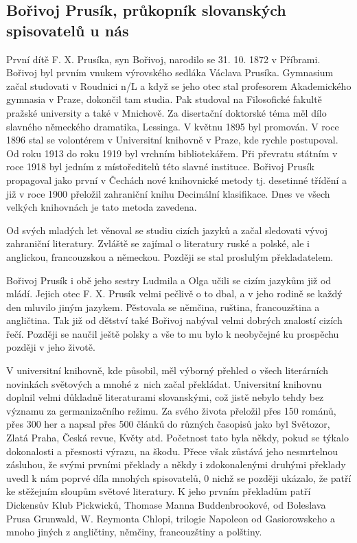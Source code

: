 \documentclass[../dejiny-rodu-prusiku.tex]{subfiles}
\begin{document}
\subsection{Bořivoj Prusík, průkopník slovanských spisovatelů u nás}

První dítě F. X. Prusíka, syn Bořivoj, narodilo se 31. 10. 1872 v Příbrami. Bořivoj byl prvním vnukem výrovského sedláka Václava Prusíka. Gymnasium začal studovati v Roudnici n/L  a když se jeho otec stal profesorem Akademického gymnasia v Praze, dokončil tam studia. Pak studoval na Filosofické fakultě pražské university a také v Mnichově. Za disertační doktorské téma měl dílo slavného německého dramatika, Lessinga. V květnu 1895 byl promován. V roce 1896 stal se volontérem v Universitní knihovně v Praze, kde rychle postupoval. Od roku 1913 do roku 1919 byl vrchním bibliotekářem. Při převratu státním v roce 1918 byl jedním z místoředitelů této slavné instituce. Bořivoj Prusík propagoval jako první v Čechách nové knihovnické metody tj. desetinné třídění a již v roce 1900 pře­ložil zahraniční knihu Decimální klasifikace. Dnes ve všech velkých knihovnách je tato metoda zavedena.

Od svých mladých let věnoval se studiu cizích jazyků a za­čal sledovati vývoj zahraniční literatury. Zvláště se zajímal o literatury ruské a polské, ale i anglickou, francouzskou a německou. Později se stal proslulým překladatelem.

Bořivoj Prusík i obě jeho sestry Ludmila a Olga učili se cizím jazykům již od mládí. Jejich otec F. X. Prusík velmi pečlivě o to dbal, a v jeho rodině se každý den mluvilo jiným jazykem. Pěstovala se němčina, ruština, francouzština a angličtina. Tak již od dětství také Bořivoj nabýval velmi dobrých znalostí cizích řečí. Pozdě­ji se naučil ještě polsky a vše to mu bylo k neobyčejné­ ku prospěchu později v jeho životě.

V universitní knihovně, kde působil, měl výborný přehled o všech literárních novinkách světových a mnohé z nich začal překládat. Universitní knihovnu doplnil velmi důkladně literaturami slovanskými, což jistě nebylo tehdy bez významu za germanizačního režimu. Za svého života přeložil přes 150 románů, přes 300 her a napsal přes 500 článků do různých časopisů jako byl Světozor, Zlatá Praha, Česká revue, Květy atd. Početnost tato byla někdy, pokud se týkalo dokonalosti a přesnosti výrazu, na škodu. Přece však zůstává jeho nesmrtelnou zásluhou, že svý­mi prvními překlady a někdy i zdokonalenými druhými překlady uvedl k nám poprvé díla mnohých spisovatelů, 0 nichž se později ukázalo, že patří ke stěžejním sloupům světové literatury. K jeho prvním překladům patří Dickensův Klub Pickwicků, Thomase Manna Buddenbrookové, od Boleslava Prusa Grunwald, W. Reymonta  Chlopi, trilogie Napoleon od Gasiorowskeho a mnoho jiných z angličtiny, němčiny, francouzštiny a polštiny.
\end{document}
